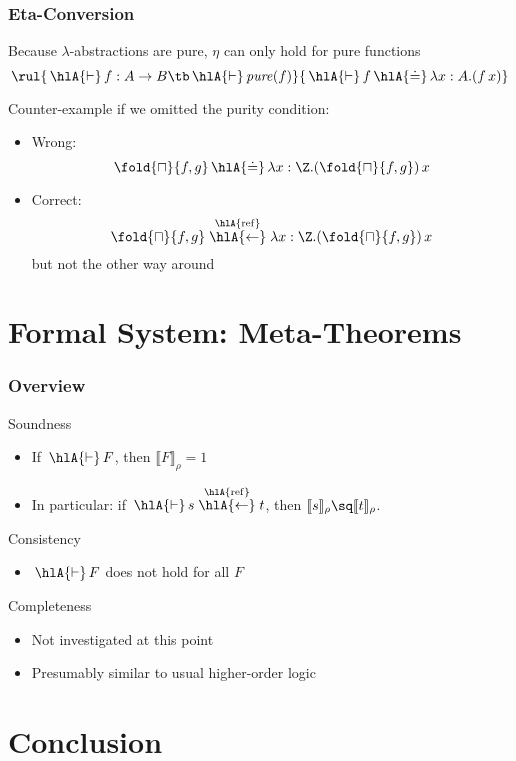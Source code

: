 \documentclass{beamer}
\def\choice#1{\fold{\sqcap}{#1}}
\def\pure#1{\mathit{pure}(#1)}
\def\refine#1#2{#1\stackrel{\hlA{\mathrm{ref}}}{\hlA{\leftarrow}}#2}
\def\der{\,\hlA{\vdash}\,}
\def\syneq{\,\hlA{\doteq}\,}
\def\seme#1#2{\llbracket#1\rrbracket_{#2}}
\def\semr#1{\seme{#1}{\rho}}
\begin{document}
\begin{frame}\frametitle{Eta-Conversion}
Because $\lambda$-abstractions are pure, $\eta$ can only hold for pure functions
\[\rul{\der f:A\to B \tb \der\pure{f}}{\der f \syneq \lambda x:A.(f\,x)}\]

Counter-example if we omitted the purity condition:
\begin{itemize}
\item Wrong:
\[\choice{f,g} \syneq \lambda x:\Z.(\choice{f,g})\,x\]
\item Correct: \[\refine{\choice{f,g}}{\lambda x:\Z.(\choice{f,g})\,x}\]
but not the other way around
\end{itemize}

%
\end{frame}

\section{Formal System: Meta-Theorems}

\begin{frame}\frametitle{Overview}
Soundness
\begin{itemize}
\item If $\der F$, then $\semr{F}=1$
\item In particular: if $\der\refine{s}{t}$, then $\semr{s}\sq\semr{t}$.
\end{itemize}

Consistency
\begin{itemize}
\item $\der F$ does not hold for all $F$
\end{itemize}

Completeness
\begin{itemize}
\item Not investigated at this point
\item Presumably similar to usual higher-order logic
\end{itemize}
\end{frame}

\section{Conclusion}
\end{document}
